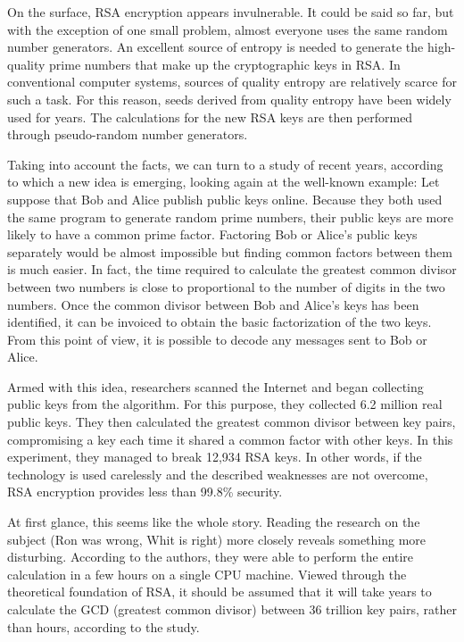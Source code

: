 \documentclass[graybox]{svmult}
\begin{document}
On the surface, RSA encryption appears invulnerable. It could be said so far, but with the exception of one small problem, almost everyone uses the same random number generators. An excellent source of entropy is needed to generate the high-quality prime numbers that make up the cryptographic keys in RSA. In conventional computer systems, sources of quality entropy are relatively scarce for such a task. For this reason, seeds derived from quality entropy have been widely used for years. The calculations for the new RSA keys are then performed through pseudo-random number generators. 

Taking into account the facts, we can turn to a study of recent years, according to which a new idea is emerging, looking again at the well-known example: Let suppose that Bob and Alice publish public keys online. Because they both used the same program to generate random prime numbers, their public keys are more likely to have a common prime factor. Factoring Bob or Alice's public keys separately would be almost impossible but finding common factors between them is much easier. In fact, the time required to calculate the greatest common divisor between two numbers is close to proportional to the number of digits in the two numbers. Once the common divisor between Bob and Alice's keys has been identified, it can be invoiced to obtain the basic factorization of the two keys. From this point of view, it is possible to decode any messages sent to Bob or Alice.

Armed with this idea, researchers scanned the Internet and began collecting public keys from the algorithm. For this purpose, they collected 6.2 million real public keys. They then calculated the greatest common divisor between key pairs, compromising a key each time it shared a common factor with other keys. In this experiment, they managed to break 12,934 RSA keys. In other words, if the technology is used carelessly and the described weaknesses are not overcome, RSA encryption provides less than 99.8\% security. 

At first glance, this seems like the whole story. Reading the research on the subject (Ron was wrong, Whit is right) more closely reveals something more disturbing. According to the authors, they were able to perform the entire calculation in a few hours on a single CPU machine. Viewed through the theoretical foundation of RSA, it should be assumed that it will take years to calculate the GCD (greatest common divisor) between 36 trillion key pairs, rather than hours, according to the study.
\end{document}
